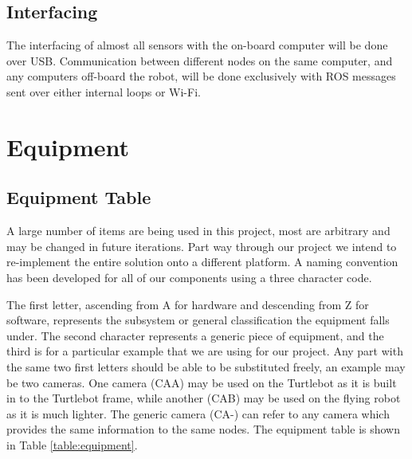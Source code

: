 \documentclass{article}
\begin{document}
	\subsection{Interfacing}
	
	The interfacing of almost all sensors with the on-board computer will be done over USB. Communication between different nodes on the same computer, and any computers off-board the robot, will be done exclusively with ROS messages sent over either internal loops or Wi-Fi.





\section{Equipment}

	\subsection{Equipment Table}
	
	A large number of items are being used in this project, most are arbitrary and may be changed in future iterations. Part way through our project we intend to re-implement the entire solution onto a different platform. A naming convention has been developed for all of our components using a three character code.
	
	The first letter, ascending from A for hardware and descending from Z for software, represents the subsystem or general classification the equipment falls under. The second character represents a generic piece of equipment, and the third is for a particular example that we are using for our project. Any part with the same two first letters should be able to be substituted freely, an example may be two cameras. One camera (CAA) may be used on the Turtlebot as it is built in to the Turtlebot frame, while another (CAB) may be used on the flying robot as it is much lighter. The generic camera (CA-) can refer to any camera which provides the same information to the same nodes. The equipment table is shown in Table \ref{table:equipment}.
	
\end{document}

